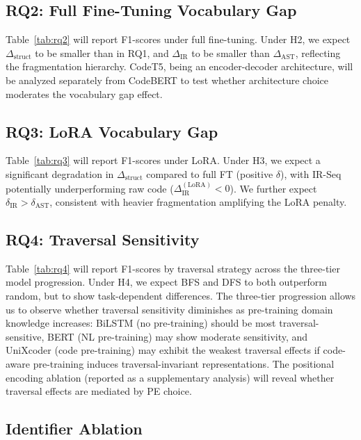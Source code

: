 \documentclass[pdflatex,sn-mathphys,Numbered]{sn-jnl}
\begin{document}
\subsection{RQ2: Full Fine-Tuning Vocabulary Gap}

Table~\ref{tab:rq2} will report F1-scores under full fine-tuning. Under H2, we expect $\Delta_{\text{struct}}$ to be smaller than in RQ1, and $\Delta_{\text{IR}}$ to be smaller than $\Delta_{\text{AST}}$, reflecting the fragmentation hierarchy. CodeT5, being an encoder-decoder architecture, will be analyzed separately from CodeBERT to test whether architecture choice moderates the vocabulary gap effect.

\subsection{RQ3: LoRA Vocabulary Gap}

Table~\ref{tab:rq3} will report F1-scores under LoRA. Under H3, we expect a significant degradation in $\Delta_{\text{struct}}$ compared to full FT (positive $\delta$), with IR-Seq potentially underperforming raw code ($\Delta_{\text{IR}}^{(\text{LoRA})} < 0$). We further expect $\delta_{\text{IR}} > \delta_{\text{AST}}$, consistent with heavier fragmentation amplifying the LoRA penalty.

\subsection{RQ4: Traversal Sensitivity}

Table~\ref{tab:rq4} will report F1-scores by traversal strategy across the three-tier model progression. Under H4, we expect BFS and DFS to both outperform random, but to show task-dependent differences. The three-tier progression allows us to observe whether traversal sensitivity diminishes as pre-training domain knowledge increases: BiLSTM (no pre-training) should be most traversal-sensitive, BERT (NL pre-training) may show moderate sensitivity, and UniXcoder (code pre-training) may exhibit the weakest traversal effects if code-aware pre-training induces traversal-invariant representations. The positional encoding ablation (reported as a supplementary analysis) will reveal whether traversal effects are mediated by PE choice.

\subsection{Identifier Ablation}
\end{document}
